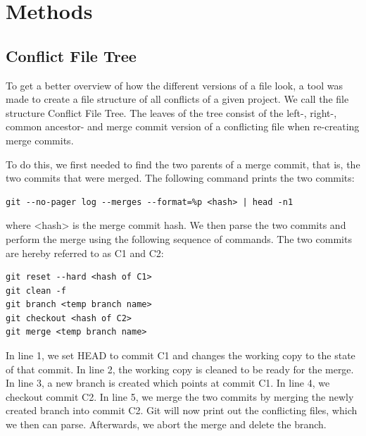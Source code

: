 \chapter{Methods}
\section{Conflict File Tree}
To get a better overview of how the different versions of a file look, a tool was made to create a file structure of all conflicts of a given project. We call the file structure Conflict File Tree. The leaves of the tree consist of the left-, right-, common ancestor- and merge commit version of a conflicting file when re-creating merge commits.

To do this, we first needed to find the two parents of a merge commit, that is, the two commits that were merged. The following command prints the two commits:
\lstset{language=Bash}
\begin{lstlisting}[frame=single]
git --no-pager log --merges --format=%p <hash> | head -n1
\end{lstlisting}
where <hash> is the merge commit hash. We then parse the two commits and perform the merge using the following sequence of commands. The two commits are hereby referred to as C1 and C2:\\
\lstset{language=Bash,numbers=left,xleftmargin=2em,frame=single,framexleftmargin=1.5em}
\begin{lstlisting}[frame=single]
git reset --hard <hash of C1>
git clean -f
git branch <temp branch name>
git checkout <hash of C2>
git merge <temp branch name>
\end{lstlisting}
In line 1, we set HEAD to commit C1 and changes the working copy to the state of that commit. In line 2,  the working copy is cleaned to be ready for the merge. In line 3, a new branch is created which points at commit C1. In line 4, we checkout commit C2. In line 5, we merge the two commits by merging the newly created branch into commit C2. Git will now print out the conflicting files, which we then can parse. Afterwards, we abort the merge and delete the branch.

